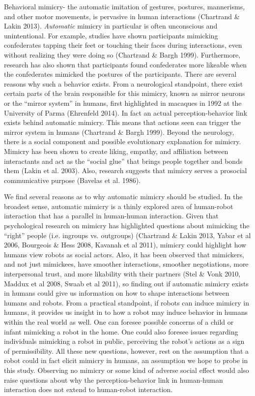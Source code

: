 \documentclass{acm_proc_article-sp}
\begin{document}
Behavioral mimicry- the automatic imitation of gestures, postures, mannerisms, and other motor movements, is pervasive in human interactions (Chartrand \& Lakin 2013). \textit{Automatic} mimicry in particular is often unconscious and unintentional. For example, studies have shown participants mimicking confederates tapping their feet or touching their faces during interactions, even without realizing they were doing so (Chartrand \& Bargh 1999). Furthermore, research has also shown that participants found confederates more likeable when the confederates mimicked the postures of the participants. There are several reasons why such a behavior exists. From a neurological standpoint, there exist certain parts of the brain responsible for this mimicry, known as mirror neurons or the ``mirror system'' in humans, first highlighted in macaques in 1992 at the University of Parma (Ehrenfeld 2014). In fact an actual perception-behavior link exists behind automatic mimicry. This means that actions seen can trigger the mirror system in humans (Chartrand \& Bargh 1999). Beyond the neurology, there is a social component and possible evolutionary explanation for mimicry. Mimicry has been shown to create liking, empathy, and affiliation between interactants and act as the ``social glue'' that brings people together and bonds them (Lakin et al. 2003). Also, research suggests that mimicry serves a prosocial communicative purpose (Bavelas et al. 1986).

We find several reasons as to why automatic mimicry should be studied. In the broadest sense, automatic mimicry is a thinly explored area of human-robot interaction that has a parallel in human-human interaction. Given that psychological research on mimicry has highlighted questions about mimicking the ``right'' people (i.e. ingroups vs. outgroups) (Chartrand \& Lakin 2013, Yabar et al 2006, Bourgeois \& Hess 2008, Kavanah et al 2011), mimicry could highlight how humans view robots as social actors. Also, it has been observed that mimickers, and not just mimickees, have smoother interactions, smoother negotiations, more interpersonal trust, and more likability with their partners (Stel \& Vonk 2010, Maddux et al 2008, Swaab et al 2011), so finding out if automatic mimicry exists in humans could give us information on how to shape interactions between humans and robots. From a practical standpoint, if robots can induce mimicry in humans, it provides us insight in to how a robot may induce behavior in humans within the real world as well. One can foresee possible concerns of a child or infant mimicking a robot in the home. One could also foresee issues regarding individuals mimicking a robot in public, perceiving the robot's actions as a sign of permissibility. All these new questions, however, rest on the assumption that a robot could in fact elicit mimicry in humans, an assumption we hope to probe in this study. Observing no mimicry or some kind of adverse social effect would also raise questions about why the perception-behavior link in human-human interaction does not extend to human-robot interaction.
\end{document}
